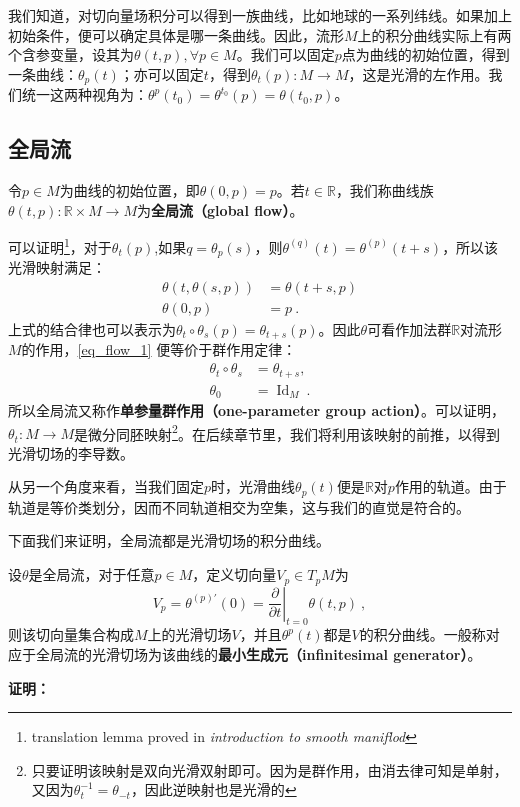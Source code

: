 我们知道，对切向量场积分可以得到一族曲线，比如地球的一系列纬线。如果加上初始条件，便可以确定具体是哪一条曲线。因此，流形$M$上的积分曲线实际上有两个含参变量，设其为$\theta(t,p),\forall p\in M$。我们可以固定$p$点为曲线的初始位置，得到一条曲线：$\theta_p(t)$；亦可以固定$t$，得到$\theta_t(p):M\rightarrow M$，这是光滑的左作用。我们统一这两种视角为：$\theta^p(t_0)=\theta^{t_0}(p)=\theta(t_0,p)$。
\subsection{全局流}
令$p\in M$为曲线的初始位置，即$\theta(0,p)=p$。若$t\in\mathbb R$，我们称曲线族$\theta(t,p):\mathbb R\times M\rightarrow M$为\textbf{全局流（global flow）}。

可以证明\footnote{translation lemma proved in \textsl{introduction to smooth maniflod}}，对于$\theta_t(p)$,如果$q=\theta_p(s)$，则$\theta^{(q)}(t)=\theta^{(p)}(t+s)$，所以该光滑映射满足：
\begin{equation}\label{eq_flow_1}
\begin{aligned}
\theta(t, \theta(s, p)) & =\theta(t+s, p) \\
\theta(0, p) & =p~.
\end{aligned}
\end{equation}
上式的结合律也可以表示为$\theta_t \circ \theta_s(p)=\theta_{t+s}(p)$。因此$\theta$可看作加法群$\mathbb R$对流形$M$的作用，\autoref{eq_flow_1} 便等价于群作用定律：
\begin{equation}
\begin{aligned}
\theta_t \circ \theta_s & =\theta_{t+s}, \\
\theta_0 & =\operatorname{Id}_M~.
\end{aligned}
\end{equation}
所以全局流又称作\textbf{单参量群作用（one-parameter group action）}。可以证明，$\theta_t:M\rightarrow M$是微分同胚映射\footnote{只要证明该映射是双向光滑双射即可。因为是群作用，由消去律可知是单射，又因为$\theta^{-1}_t=\theta_{-t}$，因此逆映射也是光滑的}。在后续章节里，我们将利用该映射的前推，以得到光滑切场的李导数。


从另一个角度来看，当我们固定$p$时，光滑曲线$\theta_p(t)$便是$\mathbb R$对$p$作用的轨道。由于轨道是等价类划分，因而不同轨道相交为空集，这与我们的直觉是符合的。

下面我们来证明，全局流都是光滑切场的积分曲线。
\begin{theorem}{}
设$\theta$是全局流，对于任意$p\in M$，定义切向量$V_p\in T_p M$为
\begin{equation}
V_p=\theta^{(p) \prime}(0)=\left.\frac{\partial}{\partial t}\right|_{t=0} \theta(t, p) ~,
\end{equation}
则该切向量集合构成$M$上的光滑切场$V$，并且$\theta^p(t)$都是$V$的积分曲线。一般称对应于全局流的光滑切场为该曲线的\textbf{最小生成元（infinitesimal
generator）}。
\end{theorem}
\textbf{证明：}

